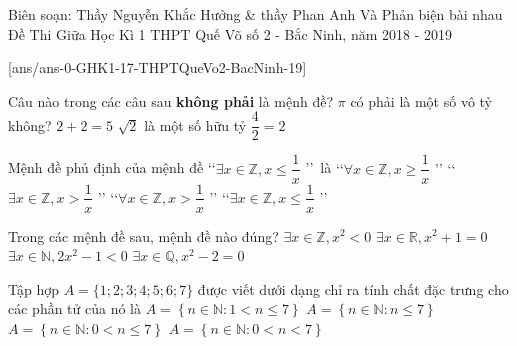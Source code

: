 \begin{name}
	{Biên soạn: Thầy Nguyễn Khắc Hưởng \& thầy Phan Anh Và Phản biện bài nhau}
	{Đề Thi Giữa Học Kì 1 THPT Quế Võ số 2 - Bắc Ninh, năm 2018 - 2019}
\end{name}

\setcounter{ex}{0}\setcounter{bt}{0}
[ans/ans-0-GHK1-17-THPTQueVo2-BacNinh-19]

\begin{ex}%
Câu nào trong các câu sau \textbf{không phải} là mệnh đề?
\choice
{\True $\pi$ có phải là một số vô tỷ không?}
{$2+2=5$}
{$\sqrt{2}$ là một số hữu tỷ}
{$\dfrac{4}{2}=2$}
\end{ex}
\begin{ex}%
	Mệnh đề phủ định của mệnh đề \lq\lq $\exists x \in \mathbb{Z}, x \le \dfrac{1}{x}$ \rq \rq\  là
	\choice
	{\lq \lq $\forall x \in \mathbb{Z}, x \ge \dfrac{1}{x} $ \rq \rq}
	{\lq \lq $\exists x \in \mathbb{Z}, x > \dfrac{1}{x}$ \rq \rq}
	{\True \lq \lq $\forall x \in \mathbb{Z}, x >\dfrac{1}{x}$ \rq \rq}
	{\lq \lq $\exists x \in \mathbb{Z}, x \le \dfrac{1}{x}$ \rq \rq}
\end{ex}
\begin{ex}%
	Trong các mệnh đề sau, mệnh đề nào đúng?
	\choice
	{$\exists x\in \mathbb{Z}, x^2<0$}
	{$\exists x\in \mathbb{R}, x^2+1=0$}
	{\True $\exists x\in \mathbb{N}, 2x^2-1<0$}
	{$\exists x\in \mathbb{Q}, x^2-2=0$}
\end{ex}
\begin{ex}%
	Tập hợp $A=\{1;2;3;4;5;6;7\}$ được viết dưới dạng chỉ ra tính chất đặc trưng cho các phần tử của nó là
	\choice
	{$A=\left\{n\in \mathbb{N}\colon 1<n\le 7\right\}$}
	{$A=\left\{n\in \mathbb{N}\colon n\le 7\right\}$}
	{\True $A=\left\{n\in \mathbb{N}\colon 0<n\le 7\right\}$}
	{$A=\left\{n\in \mathbb{N}\colon 0<n<7\right\}$}
\end{ex}
